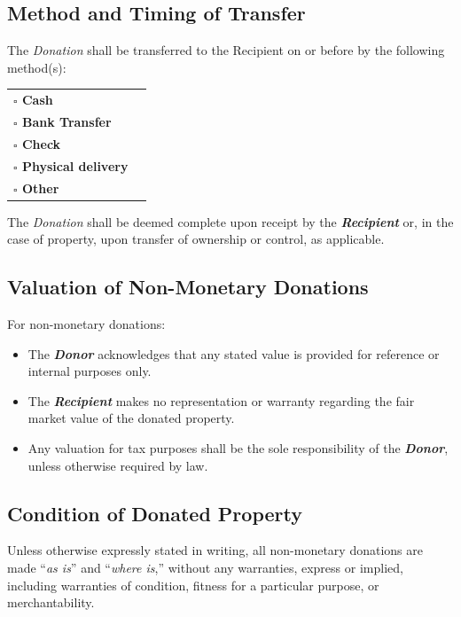 \subsection{Method and Timing of Transfer}
The \textit{Donation} shall be transferred to the Recipient on or before \donationDate{} by the following method(s):

\vspace{0.3cm}

\noindent
\begin{tabular}{p{6cm} p{10cm}}
\textbf{$\square$ Cash} & \LoanRepaymentCashMethod{} \\ 
\textbf{$\square$ Bank Transfer} & \LoanRepaymentBankMethod{} \\ 
\textbf{$\square$ Check} & \LoanRepaymentCheckMethod{} \\ 
\textbf{$\square$ Physical delivery} & \LoanRepaymentCheckMethod{} \\ 
\textbf{$\square$ Other} & \LoanRepaymentOtherMethod{} \\ 
\end{tabular}

\vspace{0.3cm}

\noindent The \textit{Donation} shall be deemed complete upon receipt by the \textbf{\textit{Recipient}} or, in the case of property, upon transfer of ownership or control, as applicable.

\subsection{Valuation of Non-Monetary Donations}
For non-monetary donations:
\begin{itemize}
  \item The \textbf{\textit{Donor}} acknowledges that any stated value is provided for reference or internal purposes only.
  \item The \textbf{\textit{Recipient}} makes no representation or warranty regarding the fair market value of the donated property.
  \item Any valuation for tax purposes shall be the sole responsibility of the \textbf{\textit{Donor}}, unless otherwise required by law.
\end{itemize}

\subsection{Condition of Donated Property}
Unless otherwise expressly stated in writing, all non-monetary donations are made “\textit{as is}” and “\textit{where is},” without any warranties, express or implied, including warranties of condition, fitness for a particular purpose, or merchantability.

